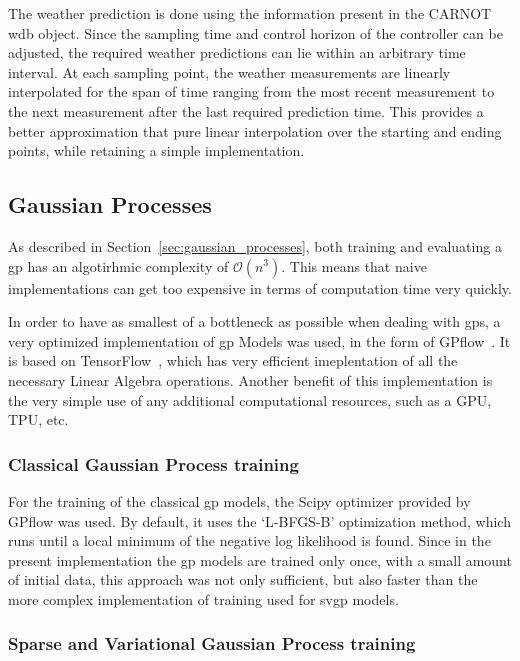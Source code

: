 The weather prediction is done using the information present in the CARNOT
\acrshort{wdb} object. Since the sampling time and control horizon of the
controller can be adjusted, the required weather predictions can lie within an
arbitrary time interval. At each sampling point, the weather measurements are
linearly interpolated for the span of time ranging from the most recent
measurement to the next measurement after the last required prediction time.
This provides a better approximation that pure linear interpolation over the
starting and ending points, while retaining a simple implementation.

\subsection{Gaussian Processes}

As described in Section~\ref{sec:gaussian_processes}, both training and
evaluating a \acrshort{gp} has an algotirhmic complexity of $\mathcal{O}(n^3)$.
This means that naive implementations can get too expensive in terms of
computation time very quickly.

In order to have as smallest of a bottleneck as possible when dealing with
\acrshort{gp}s, a very optimized implementation of \acrlong{gp} Models was
used, in the form of GPflow~\cite{matthewsGPflowGaussianProcess2017}. It is
based on TensorFlow~\cite{tensorflow2015-whitepaper}, which has very efficient
imeplentation of all the necessary Linear Algebra operations. Another benefit of
this implementation is the very simple use of any additional computational
resources, such as a GPU, TPU, etc.

\subsubsection{Classical Gaussian Process training}

For the training of the classical \acrshort{gp} models, the Scipy optimizer
provided by GPflow was used. By default, it uses the `L-BFGS-B' optimization
method, which runs until a local minimum of the negative log likelihood is
found. Since in the present implementation the \acrshort{gp} models are trained
only once, with a small amount of initial data, this approach was not only
sufficient, but also faster than the more complex implementation of training
used for \acrshort{svgp} models.

\subsubsection{Sparse and Variational Gaussian Process training}

